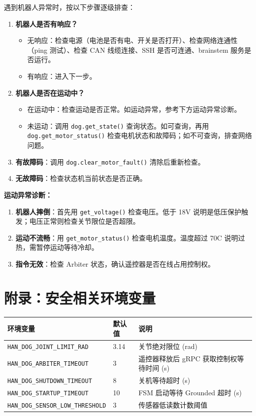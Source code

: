 \documentclass[a4paper,11pt,openany]{book}
\begin{document}
遇到机器人异常时，按以下步骤逐级排查：

\begin{enumerate}
  \item \textbf{机器人是否有响应？}
    \begin{itemize}
      \item 无响应：检查电源（电池是否有电、开关是否打开）、检查网络连通性（ping 测试）、检查 CAN 线缆连接、SSH 是否可连通、brainstem 服务是否运行。
      \item 有响应：进入下一步。
    \end{itemize}
  \item \textbf{机器人是否在运动中？}
    \begin{itemize}
      \item 在运动中：检查运动是否正常。如运动异常，参考下方运动异常诊断。
      \item 未运动：调用 \texttt{dog.get\_state()} 查询状态。如可查询，再用 \texttt{dog.get\_motor\_status()} 检查电机状态和故障码；如不可查询，排查网络问题。
    \end{itemize}
  \item \textbf{有故障码}：调用 \texttt{dog.clear\_motor\_fault()} 清除后重新检查。
  \item \textbf{无故障码}：检查状态机当前状态是否正确。
\end{enumerate}

\noindent\textbf{运动异常诊断：}

\begin{enumerate}
  \item \textbf{机器人摔倒}：首先用 \texttt{get\_voltage()} 检查电压。低于 18V 说明是低压保护触发；电压正常则检查关节限位是否超限。
  \item \textbf{运动不流畅}：用 \texttt{get\_motor\_status()} 检查电机温度。温度超过 70\textdegree C 说明过热，需暂停运动等待冷却。
  \item \textbf{指令无效}：检查 Arbiter 状态，确认遥控器是否在线占用控制权。
\end{enumerate}

\section*{附录：安全相关环境变量}

{\small
\begin{longtable}{lll}
\toprule
环境变量 & 默认值 & 说明 \\
\midrule
\endhead
\texttt{HAN\_DOG\_JOINT\_LIMIT\_RAD} & 3.14 & 关节绝对限位 (rad) \\
\texttt{HAN\_DOG\_ARBITER\_TIMEOUT} & 3 & 遥控器释放后 gRPC 获取控制权等待时间 (s) \\
\texttt{HAN\_DOG\_SHUTDOWN\_TIMEOUT} & 8 & 关机等待超时 (s) \\
\texttt{HAN\_DOG\_STARTUP\_TIMEOUT} & 10 & FSM 启动等待 Grounded 超时 (s) \\
\texttt{HAN\_DOG\_SENSOR\_LOW\_THRESHOLD} & 3 & 传感器低读数计数阈值 \\
\bottomrule
\end{longtable}
}
\end{document}
